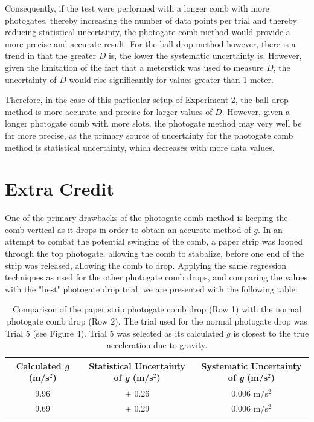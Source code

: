 \documentclass[titlepage]{article}
\begin{document}
Consequently, if the test were performed with a longer comb with more photogates, thereby increasing the number of data points per trial and thereby reducing statistical uncertainty, the photogate comb method would provide a more precise and accurate result. For the ball drop method however, there is a trend in that the greater $D$ is, the lower the systematic uncertainty is. However, given the limitation of the fact that a meterstick was used to measure $D$, the uncertainty of $D$ would rise significantly for values greater than 1 meter.

Therefore, in the case of this particular setup of Experiment 2, the ball drop method is more accurate and precise for larger values of $D$. However, given a longer photogate comb with more slots, the photogate method may very well be far more precise, as the primary source of uncertainty for the photogate comb method is statistical uncertainty, which decreases with more data values. 

\pagebreak

\section{Extra Credit}
One of the primary drawbacks of the photogate comb method is keeping the comb vertical as it drops in order to obtain an accurate method of $g$. In an attempt to combat the potential swinging of the comb, a paper strip was looped through the top photogate, allowing the comb to stabalize, before one end of the strip was released, allowing the comb to drop. Applying the same regression techniques as used for the other photogate comb drops, and comparing the values with the "best" photogate drop trial, we are presented with the following table:

\begin{table}[!htbp]
\renewcommand{\arraystretch}{1.3}
\centering
\scalebox{0.8}
{
\begin{tabular}{c|c|c}
    \hline
    \hline
    Calculated \textit{g} (m/s$^2$) & Statistical Uncertainty of \textit{g} (m/s$^2$) & Systematic Uncertainty of \textit{g} (m/s$^2$)\\
    \hline
    \hline

    9.96 &  $\pm$ 0.26 &  0.006 m/s$^2$\\
    \hline

    9.69 & $\pm$ 0.29 &  0.006 m/s$^2$ \\
    \hline
\end{tabular}
}
\caption{Comparison of the paper strip photogate comb drop (Row 1) with the normal photogate comb drop (Row 2). The trial used for the normal photogate drop was Trial 5 (see Figure 4). Trial 5 was selected as its calculated $g$ is closest to the true acceleration due to gravity.}
\end{table}
\end{document}
